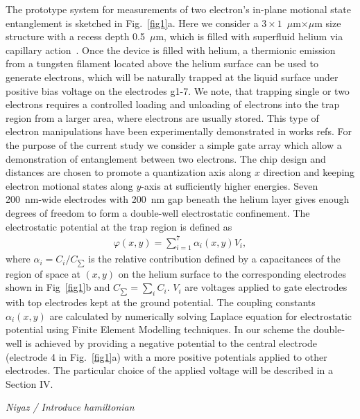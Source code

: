 \documentclass[twocolumn,superscriptaddress,unsortedaddress,
 amsmath,amssymb,
 aps,
]{revtex4-2}
\begin{document}
The prototype system for measurements of two electron's in-plane motional state entanglement is sketched in Fig.~\ref{fig1}a. Here we consider a $3 \times 1$~$\mu$m$\times\mu$m size structure with a recess depth 0.5~$\mu$m, which is filled with superfluid helium via capillary action~\cite{marty1986stability}. Once the device is filled with helium, a thermionic emission from a tungsten filament located above the helium surface can be used to generate electrons, which will be naturally trapped at the liquid surface under positive bias voltage on the electrodes g1-7. We note, that trapping single or two electrons requires a controlled loading and unloading of electrons into the trap region from a larger area, where electrons are usually stored. This type of electron manipulations have been experimentally demonstrated in works refs. For the purpose of the current study we consider a simple gate array which allow a demonstration of entanglement between two electrons. The chip design and distances are chosen to promote a quantization axis along $x$ direction and keeping electron motional states along $y$-axis at sufficiently higher energies. Seven 200~nm-wide electrodes with 200~nm gap beneath the helium layer gives enough degrees of freedom to form a double-well electrostatic confinement. The electrostatic potential at the trap region is defined as
        \begin{align}
            \varphi(x, y) = \sum_{i=1}^7 \alpha_i(x, y) V_i,
            \label{eq:trap}
        \end{align}
where $\alpha_i = C_i/C_{\sum}$ is the relative contribution defined by a capacitances of the region of space at $(x, y)$ on the helium surface to the corresponding electrodes shown in Fig~\ref{fig1}b and $C_{\sum} = \sum_i C_i$. $V_i$ are voltages applied to gate electrodes with top electrodes kept at the ground potential. The coupling constants $\alpha_i (x, y)$ are calculated by numerically solving Laplace equation for electrostatic potential using Finite Element Modelling techniques. In our scheme the double-well is achieved by providing a negative potential to the central electrode (electrode 4 in Fig.~\ref{fig1}a) with a more positive potentials applied to other electrodes. The particular choice of the applied voltage will be described in a Section IV.


\textit{Niyaz / Introduce hamiltonian}
\end{document}
